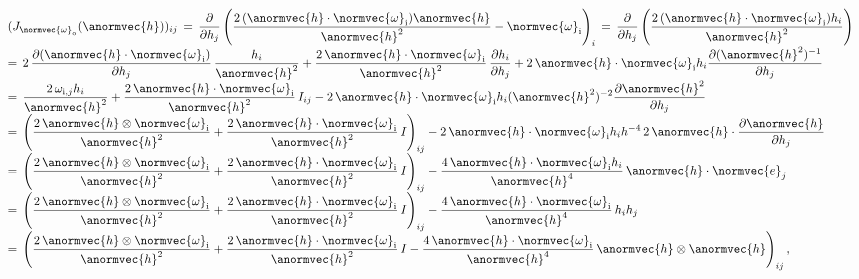 \begin{equation}
\renewcommand*{\arraystretch}{2}
\begin{array}{l}
\displaystyle (J_{\normvec{\omega}_{\text{o}}}(\anormvec{h}))_{ij} \,=\, \frac{\partial}{\partial h_{j}}\left(\frac{2\,(\anormvec{h}\cdot\normvec{\omega}_{\text{i}})\anormvec{h}}{\anormvec{h}^2} - \normvec{\omega}_{\text{i}}\right)_i  \,=\, \frac{\partial}{\partial h_{j}}\left(\frac{2\,(\anormvec{h}\cdot\normvec{\omega}_{\text{i}})h_i}{\anormvec{h}^2}\right) \\
\displaystyle =\, 2\,\frac{\partial(\anormvec{h}\cdot\normvec{\omega}_{\text{i}})}{\partial h_{j}}\,\frac{h_i}{\anormvec{h}^2} +
\frac{2\,\anormvec{h}\cdot\normvec{\omega}_{\text{i}}}{\anormvec{h}^2}\,\frac{\partial h_i}{\partial h_{j}} +
2\,\anormvec{h}\cdot\normvec{\omega}_{\text{i}}h_i\frac{\partial(\anormvec{h}^2)^{-1}}{\partial h_{j}} \\
\displaystyle =\, \frac{2\,\omega_{\text{i},j}h_i}{\anormvec{h}^2} +
\frac{2\,\anormvec{h}\cdot\normvec{\omega}_{\text{i}}}{\anormvec{h}^2}\,I_{ij} -
2\,\anormvec{h}\cdot\normvec{\omega}_{\text{i}}h_i(\anormvec{h}^2)^{-2} \frac{\partial\anormvec{h}^2}{\partial h_{j}} \\
\displaystyle =\, \left(
\frac{2\,\anormvec{h}\otimes\normvec{\omega}_{\text{i}}}{\anormvec{h}^2} +
\frac{2\,\anormvec{h}\cdot\normvec{\omega}_{\text{i}}}{\anormvec{h}^2}\,I\right)_{ij} -
2\,\anormvec{h}\cdot\normvec{\omega}_{\text{i}}h_i h^{-4}\,2\,\anormvec{h}\cdot\frac{\partial\anormvec{h}}{\partial h_{j}} \\
\displaystyle =\, \left(
\frac{2\,\anormvec{h}\otimes\normvec{\omega}_{\text{i}}}{\anormvec{h}^2} +
\frac{2\,\anormvec{h}\cdot\normvec{\omega}_{\text{i}}}{\anormvec{h}^2}\,I\right)_{ij} -
\frac{4\,\anormvec{h}\cdot\normvec{\omega}_{\text{i}}h_i}{\anormvec{h}^4}\,\anormvec{h}\cdot\normvec{e}_j \\
\displaystyle =\, \left(
\frac{2\,\anormvec{h}\otimes\normvec{\omega}_{\text{i}}}{\anormvec{h}^2} +
\frac{2\,\anormvec{h}\cdot\normvec{\omega}_{\text{i}}}{\anormvec{h}^2}\,I\right)_{ij} -
\frac{4\,\anormvec{h}\cdot\normvec{\omega}_{\text{i}}}{\anormvec{h}^4}\,h_i h_j \\
\displaystyle =\, \left(
\frac{2\,\anormvec{h}\otimes\normvec{\omega}_{\text{i}}}{\anormvec{h}^2} +
\frac{2\,\anormvec{h}\cdot\normvec{\omega}_{\text{i}}}{\anormvec{h}^2}\,I -
\frac{4\,\anormvec{h}\cdot\normvec{\omega}_{\text{i}}}{\anormvec{h}^4}\,\anormvec{h}\otimes\anormvec{h}\right)_{ij},
\end{array}
\end{equation}
